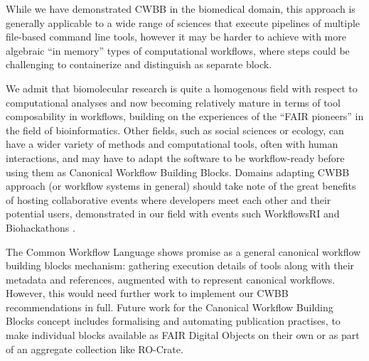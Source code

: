While we have demonstrated CWBB in the biomedical domain, this approach is generally applicable to a wide range of sciences that execute pipelines of multiple file-based command line tools, however it may be harder to achieve with more algebraic ``in memory'' types of computational workflows, where steps could be challenging to containerize and distinguish as separate block.

We admit that biomolecular research is quite a homogenous field with respect to computational analyses and now becoming relatively mature in terms of tool composability in workflows, building on the experiences of the ``FAIR pioneers'' in the field of bioinformatics.
Other fields, such as social sciences or ecology, can have a wider variety of methods and computational tools, often with human interactions, and may have to adapt the software to be workflow-ready \cite{ch6-37} before using them as Canonical Workflow Building Blocks.
Domains adapting CWBB approach (or workflow systems in general) should take note of the great benefits of hosting collaborative events where developers meet each other and their potential users, demonstrated in our field with events such WorkflowsRI \cite{ch6-39} and Biohackathons \cite{ch6-40}.

The Common Workflow Language shows promise as a general canonical workflow building blocks mechanism: gathering execution details of tools along with their metadata and references, augmented with  to represent canonical workflows.
However, this would need further work to implement our CWBB recommendations in full.
Future work for the Canonical Workflow Building Blocks concept includes formalising and automating publication practises, to make individual blocks available as FAIR Digital Objects on their own or as part of an aggregate collection like RO-Crate.
